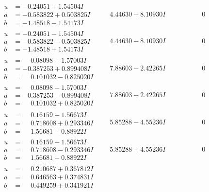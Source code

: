 \documentclass[1p]{elsarticle_modified}
\theoremstyle{definition}
\begin{document}
$$\begin{array}{c|c|c}
\begin{aligned}
u &= -0.24051 + 1.54504 I \\
a &= -0.583822 + 0.503825 I \\
b &= -1.48518 - 1.54173 I\end{aligned}
 & \phantom{-}4.44630 + 8.10930 I & \phantom{-0.000000 } 0 \\ \hline\begin{aligned}
u &= -0.24051 - 1.54504 I \\
a &= -0.583822 - 0.503825 I \\
b &= -1.48518 + 1.54173 I\end{aligned}
 & \phantom{-}4.44630 - 8.10930 I & \phantom{-0.000000 } 0 \\ \hline\begin{aligned}
u &= \phantom{-}0.08098 + 1.57003 I \\
a &= -0.387253 + 0.899408 I \\
b &= \phantom{-}0.101032 - 0.825020 I\end{aligned}
 & \phantom{-}7.88603 - 2.42265 I & \phantom{-0.000000 } 0 \\ \hline\begin{aligned}
u &= \phantom{-}0.08098 - 1.57003 I \\
a &= -0.387253 - 0.899408 I \\
b &= \phantom{-}0.101032 + 0.825020 I\end{aligned}
 & \phantom{-}7.88603 + 2.42265 I & \phantom{-0.000000 } 0 \\ \hline\begin{aligned}
u &= \phantom{-}0.16159 + 1.56673 I \\
a &= \phantom{-}0.718608 + 0.293346 I \\
b &= \phantom{-}1.56681 - 0.88922 I\end{aligned}
 & \phantom{-}5.85288 - 4.55236 I & \phantom{-0.000000 } 0 \\ \hline\begin{aligned}
u &= \phantom{-}0.16159 - 1.56673 I \\
a &= \phantom{-}0.718608 - 0.293346 I \\
b &= \phantom{-}1.56681 + 0.88922 I\end{aligned}
 & \phantom{-}5.85288 + 4.55236 I & \phantom{-0.000000 } 0 \\ \hline\begin{aligned}
u &= \phantom{-}0.210687 + 0.367812 I \\
a &= \phantom{-}0.646563 + 0.374831 I \\
b &= \phantom{-}0.449259 + 0.341921 I\end{aligned}

\end{array}$$
\end{document}
